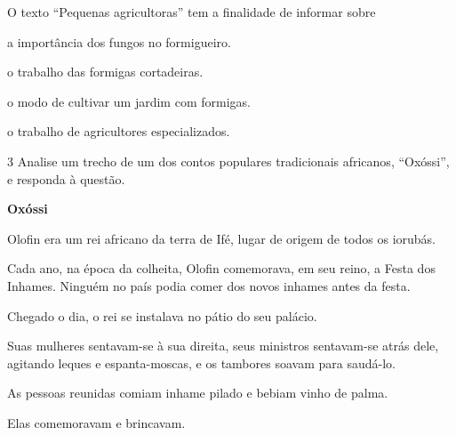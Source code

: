 O texto ``Pequenas agricultoras'' tem a finalidade de informar sobre

\begin{escolha}
\item a importância dos fungos no formigueiro.

\item o trabalho das formigas cortadeiras.

\item o modo de cultivar um jardim com formigas.

\item o trabalho de agricultores especializados.
\end{escolha}

\pagebreak

\num{3} Analise um trecho de um dos contos populares tradicionais africanos, ``Oxóssi'', e responda à questão.

\begin{myquote}
\textbf{Oxóssi}

Olofin era um rei africano da terra de Ifé, lugar de origem de todos os
iorubás.

Cada ano, na época da colheita, Olofin comemorava, em seu reino, a Festa
dos Inhames. Ninguém no país podia comer dos novos inhames antes da festa. 

Chegado o
dia, o rei se instalava no pátio do seu palácio. 

Suas mulheres sentavam-se à sua direita, seus ministros sentavam-se atrás dele, agitando leques e 
espanta-moscas, e os tambores soavam para saudá-lo.

As pessoas reunidas comiam inhame pilado e bebiam vinho de palma. 

Elas
comemoravam e brincavam.




\end{myquote}


